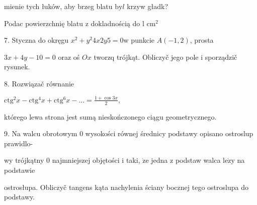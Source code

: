 \documentclass[a4paper,12pt]{article}
\begin{document}
mienie tych łuków, aby brzeg blatu $\mathrm{b}\mathrm{y}l$ krzyw gładk?

Podac powierzchnię blatu $\mathrm{z}$ dokladnością do l $\mathrm{c}\mathrm{m}^{2}$

7. Styczna do okręgu $x^{2} + y^{2} 4x 2y 5 = 0 \mathrm{w}$ punkcie $A(-1,2)$, prosta

$3x+4y-10=0$ oraz oś $Ox$ tworzq trójkąt. Obliczyč jego pole $\mathrm{i}$ sporządzič rysunek.

8. Rozwiązač równanie

$\displaystyle \mathrm{c}\mathrm{t}\mathrm{g}^{2}x-\mathrm{c}\mathrm{t}\mathrm{g}^{4}x+\mathrm{c}\mathrm{t}\mathrm{g}^{6}x-\ldots=\frac{1+\cos 3x}{2},$

którego lewa strona jest sumą nieskończonego ciągu geometrycznego.

9. Na walcu obrotowym $0$ wysokości równej średnicy podstawy opisano ostroslup prawidlo-

wy trójkątny $0$ najmniejszej objętości $\mathrm{i}$ taki, $\dot{\mathrm{z}}\mathrm{e}$ jedna $\mathrm{z}$ podstaw walca $\mathrm{l}\mathrm{e}\dot{\mathrm{z}}\mathrm{y}$ na podstawie

ostrosłupa. Obliczyč tangens kąta nachylenia ściany bocznej tego ostroslupa do podstawy.
\end{document}
